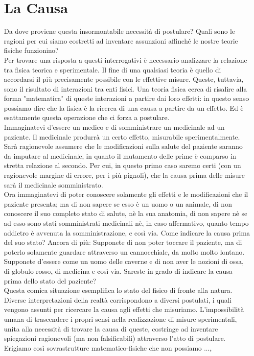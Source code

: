 \documentclass[]{article}
\begin{document}
	\section{La Causa}
	Da dove proviene questa insormontabile necessità di postulare? Quali sono le ragioni per cui siamo costretti ad inventare assunzioni affinché le nostre teorie fisiche funzionino? \\
	Per trovare una risposta a questi interrogativi è necessario analizzare la relazione tra fisica teorica e sperimentale. Il fine di una qualsiasi teoria è quello di accordarsi il più precisamente possibile con le effettive misure. Queste, tuttavia, sono il risultato di interazioni tra enti fisici. Una teoria fisica cerca di risalire alla forma "matematica" di queste interazioni a partire dai loro effetti: in questo senso possiamo dire che la fisica è la ricerca di una causa a partire da un effetto. Ed è esattamente questa operazione che ci forza a postulare.\\
	Immaginatevi d'essere un medico e di somministrare un medicinale ad un paziente. Il medicinale produrrà un certo effetto, misurabile sperimentalmente. Sarà ragionevole assumere che le modificazioni sulla salute del paziente saranno da imputare al medicinale, in quanto il mutamento delle prime è comparso in stretta relazione al secondo. Per cui, in questo primo caso saremo certi (con un ragionevole margine di errore, per i più pignoli), che la causa prima delle misure sarà il medicinale somministrato.\\
	Ora immaginatevi di poter conoscere solamente gli effetti e le modificazioni che il paziente presenta; ma di non sapere se esso è un uomo o un animale, di non conoscere il suo completo stato di salute, nè la sua anatomia, di non sapere nè se ad esso sono stati somministrati medicinali nè, in caso affermativo, quanto tempo addietro è avvenuta la somministrazione, e così via. Come indicare la causa prima del suo stato? Ancora di più: Supponete di non poter toccare il paziente, ma di poterlo solamente guardare attraverso un cannocchiale, da molto molto lontano. Supponete d'essere come un uomo delle caverne e di non aver le nozioni di ossa, di globulo rosso, di medicina e così via.
	Sareste in grado di indicare la causa prima dello stato del paziente?\\
	Questa comica situazione esemplifica lo stato del fisico di fronte alla natura. Diverse interpretazioni della realtà corrispondono a diversi postulati, i quali vengono assunti per ricercare la causa agli effetti che misuriamo. L'impossibilità umana di trascendere i propri sensi nella realizzazione di misure sperimentali, unita alla necessità di trovare la causa di queste, costringe ad inventare spiegazioni ragionevoli (ma non falsificabili) attraverso l'atto di postulare. Erigiamo così sovrastrutture matematico-fisiche che non possiamo ...,
\end{document}
